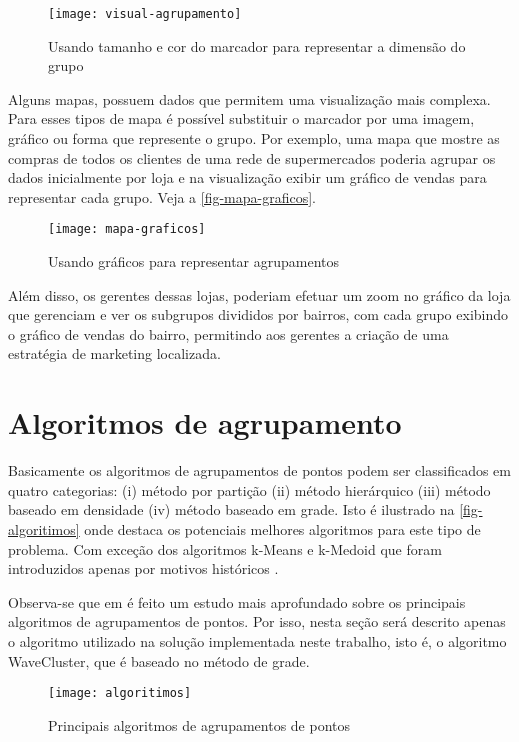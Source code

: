 		
\begin{figure}[htb]
	\caption{\label{fig-visual-agrupamento}Usando tamanho e cor do marcador para representar a dimensão do grupo}
	\begin{center}
	    \texttt{[image: visual-agrupamento]}
	\end{center}
\end{figure}

	Alguns mapas, possuem dados que permitem uma visualização mais complexa. Para esses tipos de mapa é possível substituir o marcador por uma imagem, gráfico ou forma que represente o grupo.  Por exemplo, uma mapa que mostre as compras de todos os clientes de uma rede de supermercados poderia agrupar os dados inicialmente por loja e na visualização exibir um gráfico de vendas para representar cada grupo. Veja a \autoref{fig-mapa-graficos}.
	
\begin{figure}[htb]
	\caption{\label{fig-mapa-graficos}Usando gráficos para representar agrupamentos}
	\begin{center}
	    \texttt{[image: mapa-graficos]}
	\end{center}
\end{figure}

	Além disso, os gerentes dessas lojas,  poderiam efetuar um zoom no gráfico da loja que gerenciam e ver os subgrupos divididos por bairros, com cada grupo exibindo o gráfico de vendas do bairro, permitindo aos gerentes a criação de uma estratégia de marketing localizada.
	
\section{Algoritmos de agrupamento}	
	Basicamente os algoritmos de agrupamentos de pontos podem ser classificados em quatro categorias: (i) método por partição (ii) método hierárquico (iii) método baseado em densidade (iv) método baseado em grade. Isto é ilustrado na \autoref{fig-algoritimos} onde \cite[p. 35]{silva2010solap+} destaca os potenciais melhores algoritmos para este tipo de problema. Com exceção dos algoritmos k-Means e k-Medoid que foram introduzidos apenas por motivos históricos \cite[p. 36]{silva2010solap+}.
	
	Observa-se que em \cite[capítulo 2]{silva2010solap+} é feito um estudo mais aprofundado sobre os principais algoritmos de agrupamentos de pontos. Por isso, nesta seção será descrito apenas o algoritmo  utilizado na solução implementada neste trabalho, isto é, o algoritmo WaveCluster, que é baseado no método de grade.
\begin{figure}[htb]
	\caption{\label{fig-algoritimos}Principais algoritmos de agrupamentos de pontos}
	\begin{center}
	    \texttt{[image: algoritimos]}
	\end{center}
\end{figure}

